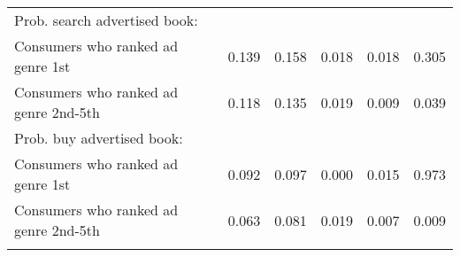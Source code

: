 \begin{center}
\begin{tabular}{lccccc}
\hspace{5pt} Prob. search advertised book: &  &  &  &  & \\
\hspace{5pt} Consumers who ranked ad genre 1st & 0.139 & 0.158 & 0.018 & 0.018 & 0.305\\
\hspace{5pt} Consumers who ranked ad genre 2nd-5th & 0.118 & 0.135 & 0.019 & 0.009 & 0.039\\
\hspace{5pt} Prob. buy advertised book: &  &  &  &  & \\
\hspace{5pt} Consumers who ranked ad genre 1st & 0.092 & 0.097 & 0.000 & 0.015 & 0.973\\
\hspace{5pt} Consumers who ranked ad genre 2nd-5th & 0.063 & 0.081 & 0.019 & 0.007 & 0.009\\
\noalign{\smallskip}\hline\end{tabular}\\
\end{center}
